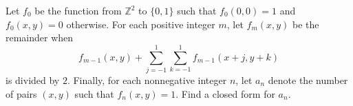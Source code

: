 Let $f_0$ be the function from $\mathbb{Z}^2$ to $\{0,1\}$ such that $f_0(0,0)=1$ and $f_0(x,y)=0$ otherwise. For each positive integer $m$, let $f_m(x,y)$ be the remainder when \[ f_{m-1}(x,y) + \sum_{j=-1}^{1} \sum_{k=-1}^{1} f_{m-1}(x+j,y+k) \] is divided by $2$.
Finally, for each nonnegative integer $n$, let $a_n$ denote the number of pairs $(x,y)$ such that $f_n(x,y) = 1$.
Find a closed form for $a_n$.

